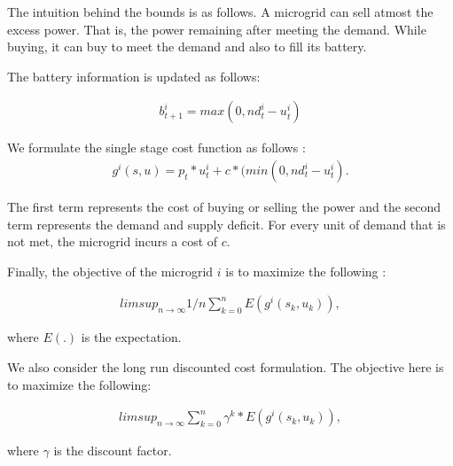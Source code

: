 The intuition behind the bounds is as follows. A microgrid can sell atmost the excess power. That is, the power remaining after meeting the demand. While buying, it can buy to meet the demand and also to fill its battery.

The battery information is updated as follows:

\begin{align}
b_{t+1}^{i} = max(0,nd_{t}^{i} - u_{t}^{i})
\end{align}

We formulate the single stage cost function as follows :
\begin{align}
g^{i}(s,u) = p_{t}*u_{t}^{i} + c*(min(0,nd_{t}^{i} - u_{t}^{i}).
\end{align}

The first term represents the cost of buying or selling the power and the second term represents the demand and supply deficit. For every unit of demand that is not met, the microgrid incurs a cost of $c$. 

Finally, the objective of the microgrid $i$ is to maximize the following \cite{avgcost}:

\begin{align}
limsup_{n \rightarrow \infty} 1/n \sum_{k = 0}^{n} E(g^{i}(s_{k},u_{k})),
\end{align}

where $E(.)$ is the expectation. 

We also consider the long run discounted cost formulation. The objective here is to maximize the following:

\begin{align}
limsup_{n \rightarrow \infty} \sum_{k = 0}^{n} \gamma^{k} * E(g^{i}(s_{k},u_{k})),
\end{align}

where $\gamma$ is the discount factor. 




